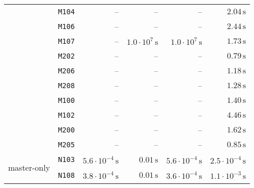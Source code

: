 \begin{tabular}{cc|rrrr}
 & \texttt{\footnotesize                 M104} &                              -- &                              -- &                              -- & $             2.04\,\text{s}$\\
 & \texttt{\footnotesize                 M106} &                              -- &                              -- &                              -- & $             2.44\,\text{s}$\\
 & \texttt{\footnotesize                 M107} &                              -- & $  1.0\cdot 10^{7}\,\text{s}$ & $  1.0\cdot 10^{7}\,\text{s}$ & $             1.73\,\text{s}$\\
 & \texttt{\footnotesize                 M202} &                              -- &                              -- &                              -- & $             0.79\,\text{s}$\\
 & \texttt{\footnotesize                 M206} &                              -- &                              -- &                              -- & $             1.18\,\text{s}$\\
 & \texttt{\footnotesize                 M208} &                              -- &                              -- &                              -- & $             1.28\,\text{s}$\\
 & \texttt{\footnotesize                 M100} &                              -- &                              -- &                              -- & $             1.40\,\text{s}$\\
 & \texttt{\footnotesize                 M102} &                              -- &                              -- &                              -- & $             4.46\,\text{s}$\\
 & \texttt{\footnotesize                 M200} &                              -- &                              -- &                              -- & $             1.62\,\text{s}$\\
 & \texttt{\footnotesize                 M205} &                              -- &                              -- &                              -- & $             0.85\,\text{s}$\\
\hline
\multirow{19}{*}{\begin{turn}{90}master-only\end{turn}}
 & \texttt{\footnotesize                 N103} & $ 5.6\cdot 10^{-4}\,\text{s}$ & $             0.01\,\text{s}$ & $ 5.6\cdot 10^{-4}\,\text{s}$ & $ 2.5\cdot 10^{-4}\,\text{s}$\\
 & \texttt{\footnotesize                 N108} & $ 3.8\cdot 10^{-4}\,\text{s}$ & $             0.01\,\text{s}$ & $ 3.6\cdot 10^{-4}\,\text{s}$ & $ 1.1\cdot 10^{-3}\,\text{s}$\\

\end{tabular}
